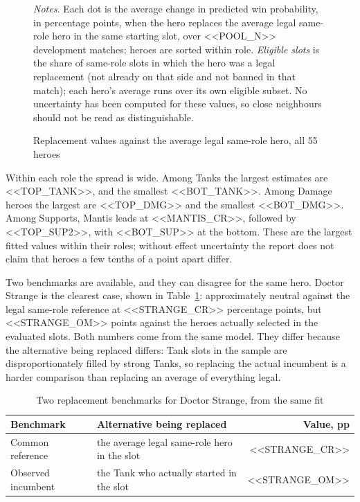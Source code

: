 \documentclass[11pt]{article}
\begin{document}
\begin{figure}[H]\centering
\caption{Replacement values against the average legal same-role hero, all 55 heroes}\label{fig:repl}
\vspace{2pt}


\begin{minipage}{0.95\linewidth}\footnotesize\vspace{2pt}
\emph{Notes.} Each dot is the average change in predicted win probability, in percentage points, when the
hero replaces the average legal same-role hero in the same starting slot, over <<POOL_N>> development
matches; heroes are sorted within role. \emph{Eligible slots} is the share of same-role slots in which the
hero was a legal replacement (not already on that side and not banned in that match); each hero's average
runs over its own eligible subset. No uncertainty has been computed for these values, so close neighbours
should not be read as distinguishable.
\end{minipage}
\end{figure}

Within each role the spread is wide. Among Tanks the largest estimates are <<TOP_TANK>>, and the smallest
<<BOT_TANK>>. Among Damage heroes the largest are <<TOP_DMG>> and the smallest <<BOT_DMG>>. Among
Supports, Mantis leads at <<MANTIS_CR>>, followed by <<TOP_SUP2>>, with <<BOT_SUP>> at the bottom. These are
the largest fitted values within their roles; without effect uncertainty the report does not claim that
heroes a few tenths of a point apart differ.

Two benchmarks are available, and they can disagree for the same hero. Doctor Strange is the clearest
case, shown in Table~\ref{tab:strange}: approximately neutral against the legal same-role reference at
<<STRANGE_CR>> percentage points, but <<STRANGE_OM>> points against the heroes actually selected in the
evaluated slots. Both numbers come from the same model. They differ because the alternative being replaced
differs: Tank slots in the sample are disproportionately filled by strong Tanks, so replacing the actual
incumbent is a harder comparison than replacing an average of everything legal.

\begin{table}[H]\centering\small
\caption{Two replacement benchmarks for Doctor Strange, from the same fit}\label{tab:strange}
\begin{tabular}{l l r}
\toprule
Benchmark & Alternative being replaced & Value, pp \\
\midrule
Common reference & the average legal same-role hero in the slot & <<STRANGE_CR>> \\
Observed incumbent & the Tank who actually started in the slot & <<STRANGE_OM>> \\
\bottomrule
\end{tabular}
\end{table}
\end{document}
